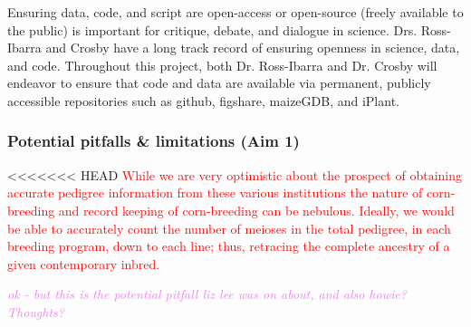 \documentclass[12pt]{article}
\newcommand{\kc}[1]{\textcolor{violet}{ \emph{\scriptsize  #1}} }
\begin{document}
Ensuring data, code, and script are open-access or open-source (freely available to the public) is important for critique, debate, and dialogue in science. 
Drs. Ross-Ibarra and Crosby have a long track record of ensuring openness in science, data, and code. Throughout this project, both Dr. Ross-Ibarra and Dr. Crosby will endeavor to ensure that code and data are available via permanent, publicly accessible repositories such as github, figshare, maizeGDB, and iPlant.

\subsubsection*{Potential pitfalls \& limitations (Aim 1)}
<<<<<<< HEAD
\textcolor{red}{While we are very optimistic about the prospect of obtaining accurate pedigree information from these various institutions the nature of corn-breeding and record keeping of corn-breeding can be nebulous. 
Ideally, we would be able to accurately count the number of meioses in the total pedigree, in each breeding program, down to each line; thus, retracing the complete ancestry of a given contemporary inbred. }

\kc{ok - but this is the potential pitfall liz lee was on about, and also howie? Thoughts?}


\end{document}
